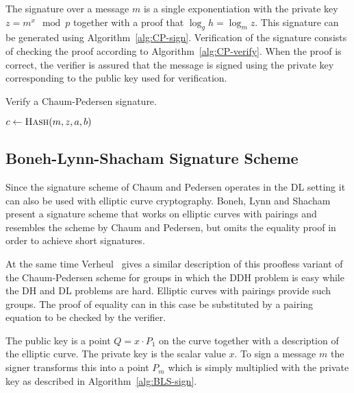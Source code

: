The signature over a message $m$ is a single exponentiation with the private key
$z = m^x \mod p$ together with a proof that $\log_g h = \log_m z$. This
signature can be generated using Algorithm~\ref{alg:CP-sign}. Verification of
the signature consists of checking the proof according to
Algorithm~\ref{alg:CP-verify}. When the proof is correct, the verifier is
assured that the message is signed using the private key corresponding to the
public key used for verification.

\begin{algorithm}
  \caption{Verify a Chaum-Pedersen signature.}
  \label{alg:CP-verify}
  \addtolength{\baselineskip}{1mm}
  \begin{algorithmic}[1]
      \State $c \gets \Call{Hash}{m, z, a, b}$

      \Return {}
      \EndIf

      \Return {}
      \EndIf

      \Return {}
    \EndFunction
  \end{algorithmic}
\end{algorithm}

\subsection{Boneh-Lynn-Shacham Signature Scheme}

Since the signature scheme of Chaum and Pedersen operates in the DL setting it
can also be used with elliptic curve cryptography. Boneh, Lynn and
Shacham~\cite{BonehLS01,BonehLS04} present a signature scheme that works on
elliptic curves with pairings and resembles the scheme by Chaum and Pedersen,
but omits the equality proof in order to achieve short signatures.

At the same time Verheul~\cite{Verheul01} gives a similar description of this
proofless variant of the Chaum-Pedersen scheme for groups in which the DDH
problem is easy while the DH and DL problems are hard. Elliptic curves with
pairings provide such groups. The proof of equality can in this case be
substituted by a pairing equation to be checked by the verifier.

The public key is a point $Q = x \cdot P_1$ on the curve together with a
description of the elliptic curve. The private key is the scalar value $x$. To
sign a message $m$ the signer transforms this into a point $P_m$ which is simply
multiplied with the private key as described in Algorithm~\ref{alg:BLS-sign}.

